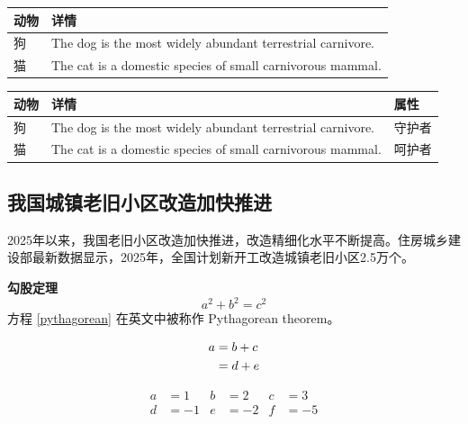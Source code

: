 \begin{table}[ht]
	\centering
	
	\label{tab:t1} %
	\begin{tabular}{lp{10cm}}
		\toprule
		动物 & 详情 \\
		\midrule
		狗    & The dog is the most widely abundant terrestrial carnivore. \\
		\addlinespace
		猫    & The cat is a domestic species of small carnivorous mammal.\\
		\bottomrule
	\end{tabular}
\end{table}

\begin{table}[ht]
	\centering
	\begin{tabularx}{0.8\textwidth}
		{
			|>{\centering\arraybackslash}X %
			|>{\raggedright\arraybackslash}X %
			|>{\raggedleft\arraybackslash}X| %
		}
		\hline
		动物 & 详情 & 属性 \\
		\hline
		狗    & The dog is the most widely abundant terrestrial carnivore. & 守护者\\
		\hline
		猫    & The cat is a domestic species of small carnivorous mammal. & 呵护者\\
		\hline
	\end{tabularx}
\end{table}

\subsection{我国城镇老旧小区改造加快推进}
2025年以来，我国老旧小区改造加快推进，改造精细化水平不断提高。住房城乡建设部最新数据显示，2025年，全国计划新开工改造城镇老旧小区2.5万个。

\textbf{勾股定理}
\begin{equation}
	a^2 + b^2 = c^2 \label{pythagorean}
\end{equation}
方程 \eqref{pythagorean} 在英文中被称作 Pythagorean theorem。

\begin{align}
	a & = b + c \notag \\ %
	& = d + e
\end{align}

\begin{align}
	a &=1 & b &=2 & c &=3\\
	d &=-1 & e &=-2 & f &=-5
\end{align}

